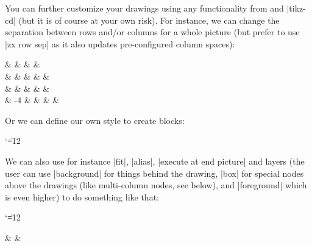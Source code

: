 \documentclass[a4paper]{ltxdoc}
\begin{document}
{You can further customize your drawings using any functionality from \tikzname{} and |tikz-cd| (but it is of course at your own risk). For instance, we can change the separation between rows and/or columns for a whole picture (but prefer to use |zx row sep| as it also updates pre-configured column spaces):
\begin{codeexample}[width=0pt]
  \begin{ZX}[row sep=1mm]
                &                                         &                        & & \zxZ{\pi} \\
    \zxN{} \rar & \zxX{} \ar[rd,(.] \ar[urrr,(',H]        &                        & &  & \zxN{} \\
                &                                         & \zxZ{} \ar[rd,s.] \rar &
        \ar[uur,('] \ar[rru,<'] \ar[rr] &  & \zxN{} \\
    \zxN{} \rar & \zxFracZ-{\pi}{4} \ar[ru,('] \ar[rr,o.] &            & \zxX{} \ar[rr] &  & \zxN{}
  \end{ZX}
\end{codeexample}
Or we can define our own style to create blocks:
{\catcode`\|=12 %
\begin{codeexample}[width=0pt]
{ %
}
\end{codeexample}
}
We can also use for instance |fit|, |alias|, |execute at end picture| and layers (the user can use |background| for things behind the drawing, |box| for special nodes above the drawings (like multi-column nodes, see below), and |foreground| which is even higher) to do something like that:
{\catcode`\|=12 %
\begin{codeexample}[width=3cm]
\begin{ZX}[
  execute at end picture={
    \node[
      inner sep=2pt,
      node on layer=background, %
      rounded corners,
      draw=blue,
      dashed,
      fill=blue!50!white,
      opacity=.5,
      fit=(cnot1)(cnot2), %
      "\textsc{cnot}" above %
    ] {};
  }
  ]
  \zxNone{} \rar & \zxZ[alias=cnot1]{} \dar \rar & \zxNone{}\\

\end{ZX}
\end{codeexample}}}
\end{document}
